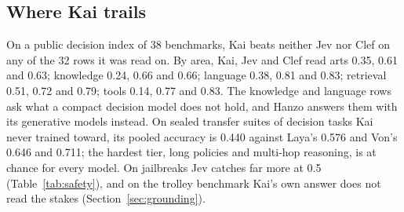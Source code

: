 \subsection{Where Kai trails}
\label{sec:trails}

On a public decision index of 38 benchmarks, Kai beats neither Jev nor Clef on
any of the 32 rows it was read on. By area, Kai, Jev and Clef read arts 0.35,
0.61 and 0.63; knowledge 0.24, 0.66 and 0.66; language 0.38, 0.81 and 0.83;
retrieval 0.51, 0.72 and 0.79; tools 0.14, 0.77 and 0.83. The knowledge and
language rows ask what a compact decision model does not hold, and Hanzo answers them
with its generative models instead. On sealed transfer suites of decision tasks
Kai never trained toward, its pooled accuracy is 0.440 against Laya's 0.576 and
Von's 0.646 and 0.711; the hardest tier, long policies and multi-hop
reasoning, is at chance for every model. On jailbreaks Jev catches far more at
0.5 (Table~\ref{tab:safety}), and on the trolley benchmark Kai's own answer
does not read the stakes (Section~\ref{sec:grounding}).
